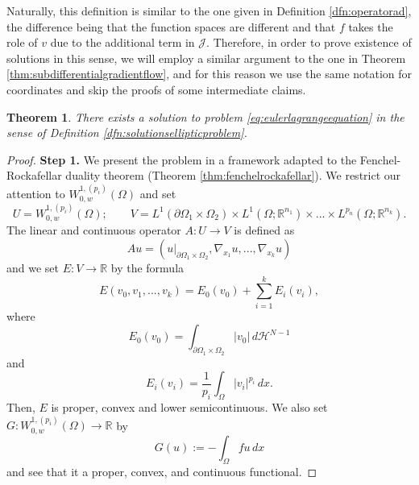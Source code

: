 \documentclass[reqno,12pt]{amsart}
\newtheorem{theorem}{Theorem}[section]
\numberwithin{equation}{section}
\begin{document}
Naturally, this definition is similar to the one given in Definition \ref{dfn:operatorad}, the difference being that the function spaces are different and that $f$ takes the role of $v$ due to the additional term in $\mathcal{J}$. Therefore, in order to prove existence of solutions in this sense, we will employ a similar argument to the one in Theorem \ref{thm:subdifferentialgradientflow}, and for this reason we use the same notation for coordinates and skip the proofs of some intermediate claims.

\begin{theorem}\label{thm:existenceellipticproblem}
There exists a solution to problem \eqref{eq:eulerlagrangeequation} in the sense of Definition \ref{dfn:solutionsellipticproblem}.
\end{theorem}

\begin{proof} 
{\bf Step 1.} We present the problem in a framework adapted to the Fenchel-Rockafellar duality theorem (Theorem \ref{thm:fenchelrockafellar}). We restrict our attention to $W_{0,w}^{1,(p_i)}(\Omega)$ and set 
$$U = W_{0,w}^{1,(p_i)}(\Omega); \qquad V = L^1(\partial\Omega_1 \times \Omega_2) \times L^1(\Omega; \mathbb{R}^{n_1}) \times ... \times L^{p_n}(\Omega; \mathbb{R}^{n_k}). $$
The linear and continuous operator $A: U \rightarrow V$ is defined as
$$ Au = (u|_{\partial\Omega_1 \times \Omega_2}, \nabla_{x_1} u, ..., \nabla_{x_k} u)$$
and we set $E: V \rightarrow \mathbb{R}$ by the formula
\begin{equation}
E(v_0,v_1,...,v_k) = E_0(v_0) + \sum_{i=1}^k E_i(v_i),
\end{equation}
where
\begin{equation}
E_0(v_0) = \int_{\partial\Omega_1 \times \Omega_2} \vert v_0 \vert \,d\mathcal{H}^{N-1}
\end{equation}
and
\begin{equation}
E_i(v_i) = \frac{1}{p_i} \int_\Omega |v_i|^{p_i} \, dx.
\end{equation}
Then, $E$ is proper, convex and lower semicontinuous. We also set $G: W_{0,w}^{1,(p_i)}(\Omega) \rightarrow \mathbb{R}$ by
$$G(u):= - \int_\Omega f u \, dx$$
and see that it a proper, convex, and continuous functional.


\end{proof}
\end{document}
